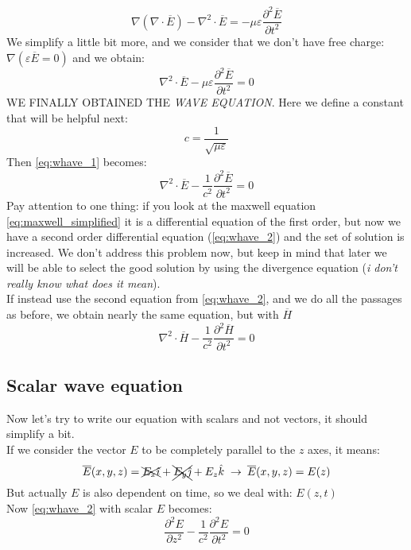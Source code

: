 \begin{equation}
    \nabla(\nabla\cdot \overline{E})-\nabla^2\cdot\overline{E}=-\mu \varepsilon \frac{\partial^2\overline{E}}{\partial t^2}
\end{equation}
We simplify a little bit more, and we consider that we don't have free charge: $\nabla(\varepsilon \overline{E}=0)$ and we obtain:
\begin{equation}\label{eq:whave_1}
    \nabla^2\cdot\overline{E}-\mu \varepsilon \frac{\partial^2\overline{E}}{\partial t^2}=0
\end{equation}
WE FINALLY OBTAINED THE \emph{WAVE EQUATION}. Here we define a constant that will be helpful next:
\begin{equation}
    c=\frac{1}{\sqrt{\mu\varepsilon}}
\end{equation}
Then \cref{eq:whave_1} becomes:
\begin{equation}\label{eq:whave_2}
    \nabla^2\cdot\overline{E}-\frac{1}{c^2} \frac{\partial^2\overline{E}}{\partial t^2}=0
\end{equation}
Pay attention to one thing: if you look at the maxwell equation \cref{eq:maxwell_simplified} it is a differential equation of the first order, but now we have a second order differential equation (\cref{eq:whave_2}) and the set of solution is increased. We don't address this problem now, but keep in mind that later we will be able to select the good solution by using the divergence equation (\textsl{i don't really know what does it mean}).\\
If instead use the second equation from \cref{eq:whave_2}, and we do all the passages as before, we obtain nearly the same equation, but with $\overline{H}$
\begin{equation}
    \nabla^2\cdot\overline{H}-\frac{1}{c^2} \frac{\partial^2\overline{H}}{\partial t^2}=0
\end{equation}
\subsection*{Scalar wave equation}
Now let's try to write our equation with scalars and not vectors, it should simplify a bit.\\
If we consider the vector $E$ to be completely parallel to the $z$ axes, it means:
\begin{equation}
    \overline{E}(x,y,z)=\xcancel{E_x\hat{\imath}}+\xcancel{E_y\hat{\jmath}}+E_z\hat{\mathnormal{k}}\;\rightarrow \:\overline{E}(x,y,z)=E(z)
\end{equation}
But actually $E$ is also dependent on time, so we deal with: $E(z,t)$\\
Now \cref{eq:whave_2} with scalar $E$ becomes:
\begin{equation}\label{eq:whave_simplified}
    \frac{\partial^2E}{\partial z^2}-\frac{1}{c^2} \frac{\partial^2E}{\partial t^2}=0
\end{equation}
